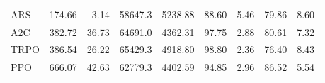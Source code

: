 \begin{samepage}
\begin{center}
\begin{tabular}{l|rr|rr|rr|rr}
    ARS          &   174.66 &     3.14 &    58647.3 &    5238.88 &   88.60 &    5.46 &   79.86 &    8.60 \\
    A2C          &   382.72 &    36.73 &    64691.0 &    4362.31 &   97.75 &    2.88 &   80.61 &    7.32 \\
    TRPO         &   386.54 &    26.22 &    65429.3 &    4918.80 &   98.80 &    2.36 &   76.40 &    8.43 \\
    PPO          &   666.07 &    42.63 &    62779.3 &    4402.59 &   94.85 &    2.96 &   86.52 &    5.54 \\
    \bottomrule
  \end{tabular}
\end{center}
\end{samepage}

